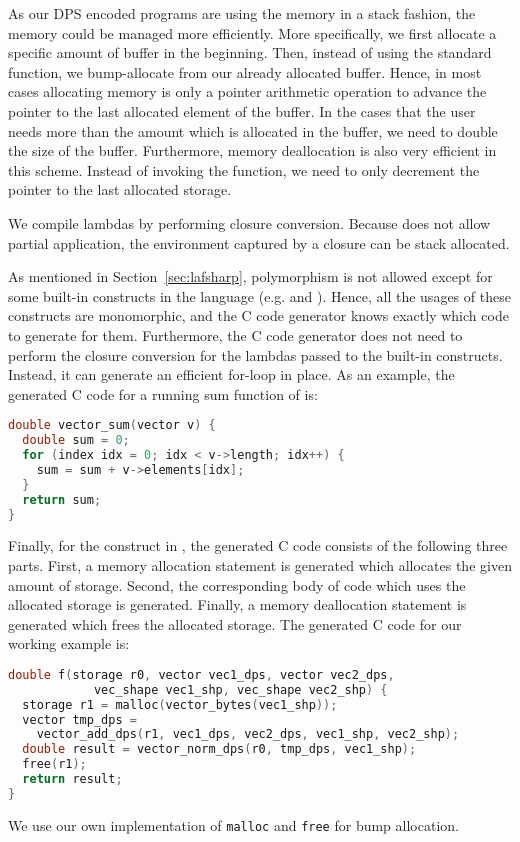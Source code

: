 As our DPS encoded programs are using the memory in a stack fashion, the memory could be managed more efficiently. More specifically, we first allocate a specific amount of buffer in the beginning. Then, instead of using the standard  function, we bump-allocate from our already allocated buffer. Hence, in most cases allocating memory is only a pointer arithmetic operation to advance the pointer to the last allocated element of the buffer. In the cases that the user needs more than the amount which is allocated in the buffer, we need to double the size of the buffer. Furthermore, memory deallocation is also very efficient in this scheme. Instead of invoking the  function, we need to only decrement the pointer to the last allocated storage.

We compile lambdas by performing closure conversion. Because \salafsharp{} does not allow partial application, the environment captured by a closure can be stack allocated.

As mentioned in Section~\ref{sec:lafsharp}, polymorphism is not allowed except for some built-in constructs in the language (e.g. \vbuildk{} and \viteratek{}). Hence, all the usages of these constructs are monomorphic, and the C code generator knows exactly which code to generate for them. Furthermore, the C code generator does not need to perform the closure conversion for the lambdas passed to the built-in constructs. Instead, it can generate an efficient for-loop in place. As an example, the generated C code for a running sum function of \lafsharp{} is:\\[-6pt]
\begin{lstlisting}[language=C, numbers=none]
double vector_sum(vector v) {
  double sum = 0;
  for (index idx = 0; idx < v->length; idx++) {
    sum = sum + v->elements[idx];
  }
  return sum;
}
\end{lstlisting}

Finally, for the  construct in \salafsharp{}, the generated C code consists of the following three parts. First, a memory allocation statement is generated which allocates the given amount of storage. Second, the corresponding body of code which uses the allocated storage is generated. Finally, a memory deallocation statement is generated which frees the allocated storage. The generated C code for our working example is:\\[-6pt]
\begin{lstlisting}[language=C, numbers=none]
double f(storage r0, vector vec1_dps, vector vec2_dps, 
            vec_shape vec1_shp, vec_shape vec2_shp) {
  storage r1 = malloc(vector_bytes(vec1_shp));
  vector tmp_dps = 
    vector_add_dps(r1, vec1_dps, vec2_dps, vec1_shp, vec2_shp);
  double result = vector_norm_dps(r0, tmp_dps, vec1_shp);
  free(r1);
  return result;
}
\end{lstlisting}
We use our own implementation of \lstinline|malloc| and \lstinline|free| for bump allocation.

